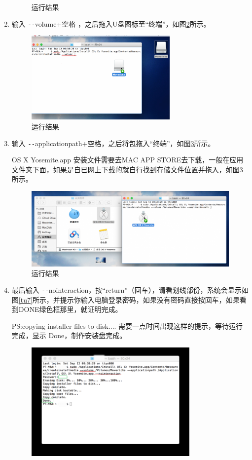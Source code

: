 \documentclass{article}
\begin{document}
\begin{enumerate}
\begin{figure}[!htb]
\caption{运行结果}
\label{tu4}
\end{figure}
\item 输入 \verb|--|volume+空格 ，之后拖入U盘图标至“终端”，如图\ref{tu5}所示。
\begin{figure}[!htb] %
\centering
\includegraphics[width=0.7\textwidth]{figures/tu5.png}
\caption{运行结果}
\label{tu5}
\end{figure}
\item 输入 \verb|--|applicationpath+空格，之后将包拖入“终端”，如图\ref{tu6}所示。\par
OS X Yosemite.app 安装文件需要去MAC APP STORE去下载，一般在应用文件夹下面，如果是自已网上下载的就自行找到存储文件位置并拖入，如图\ref{tu6}所示。
\begin{figure}[!htb] %
\centering
\includegraphics[width=1.1\textwidth]{figures/tu6.png}
\caption{运行结果}
\label{tu6}
\end{figure}
\item 最后输入 \verb|--|nointeraction，按“return”（回车），请看划线部份，系统会显示如图\ref{tu7}所示，并提示你输入电脑登录密码，如果没有密码直接按回车，如果看到DONE绿色框那里，就证明完成。\par
PS:copying installer files to disk.... 需要一点时间出现这样的提示，等待运行完成，显示 Done，制作安装盘完成。
\begin{figure}[!htb] %
\centering
\includegraphics[width=0.8\textwidth]{figures/tu7.png}

\end{figure}
\end{enumerate}
\end{document}
